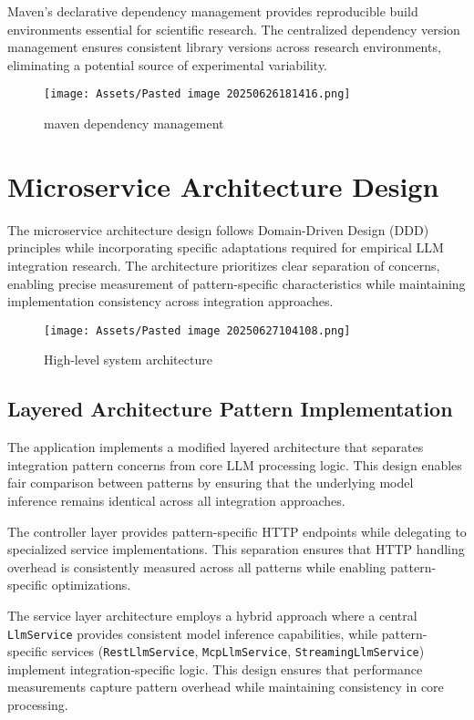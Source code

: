 Maven's declarative dependency management provides reproducible build environments essential for scientific research. The centralized dependency version management ensures consistent library versions across research environments, eliminating a potential source of experimental variability.

\begin{figure}[H]
    \centering
    \texttt{[image: Assets/Pasted image 20250626181416.png]}
    \caption{maven dependency management}
\end{figure}

\section{Microservice Architecture Design}

The microservice architecture design follows Domain-Driven Design (DDD) principles while incorporating specific adaptations required for empirical LLM integration research. The architecture prioritizes clear separation of concerns, enabling precise measurement of pattern-specific characteristics while maintaining implementation consistency across integration approaches.

\begin{figure}[H]
    \centering
    \texttt{[image: Assets/Pasted image 20250627104108.png]}
    \caption{High-level system architecture}
\end{figure}

\subsection{Layered Architecture Pattern Implementation}

The application implements a modified layered architecture that separates integration pattern concerns from core LLM processing logic. This design enables fair comparison between patterns by ensuring that the underlying model inference remains identical across all integration approaches.

The controller layer provides pattern-specific HTTP endpoints while delegating to specialized service implementations. This separation ensures that HTTP handling overhead is consistently measured across all patterns while enabling pattern-specific optimizations.

The service layer architecture employs a hybrid approach where a central \texttt{LlmService} provides consistent model inference capabilities, while pattern-specific services (\texttt{RestLlmService}, \texttt{McpLlmService}, \texttt{StreamingLlmService}) implement integration-specific logic. This design ensures that performance measurements capture pattern overhead while maintaining consistency in core processing.

